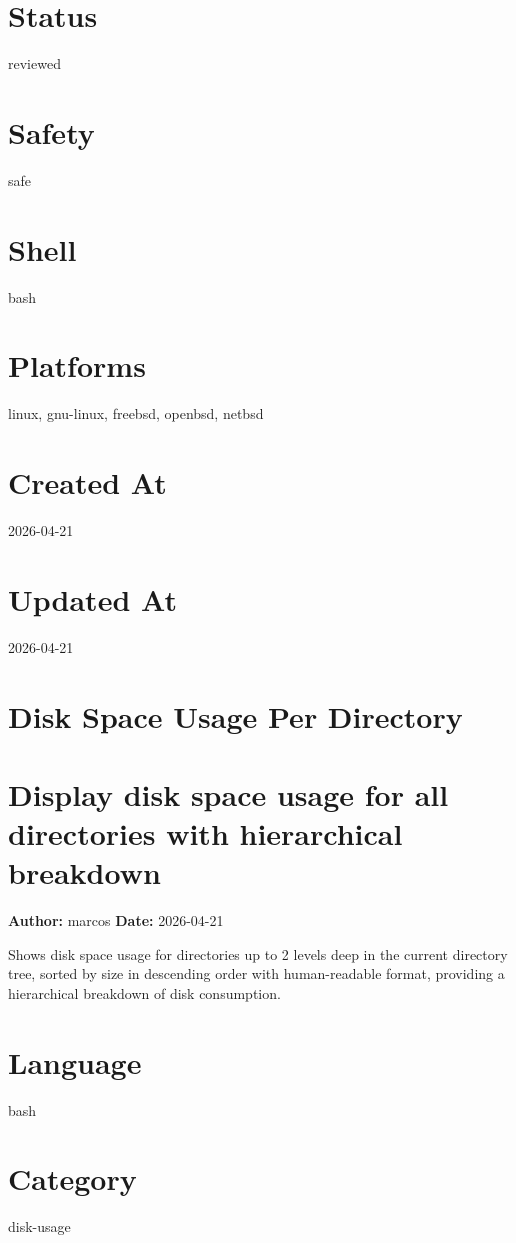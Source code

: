 \documentclass[openany]{book}
\begin{document}
\section*{Status}
reviewed

\section*{Safety}
safe

\section*{Shell}
bash

\section*{Platforms}
linux, gnu-linux, freebsd, openbsd, netbsd

\section*{Created At}
2026-04-21

\section*{Updated At}
2026-04-21

\section{Disk Space Usage Per Directory}
\section*{Display disk space usage for all directories with hierarchical breakdown}
\textbf{Author:} marcos \hfill \textbf{Date:} 2026-04-21

\noindent Shows disk space usage for directories up to 2 levels deep in the current directory tree, sorted by size in descending order with human-readable format, providing a hierarchical breakdown of disk consumption.

\section*{Language}
bash

\section*{Category}
disk-usage
\end{document}
